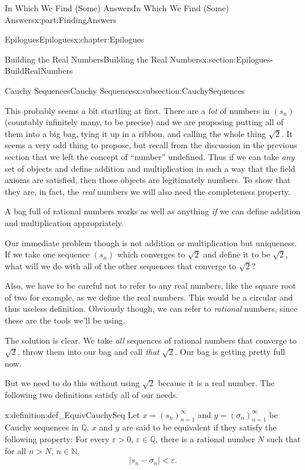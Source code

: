 \documentclass[oneside,10pt,]{book}
\numberwithin{equation}{section}
\newcommand{\abs}[1]{\left|#1\right|}
\newcommand{\eps}{\varepsilon}
\newcommand{\QQ}{\mathbb {Q}}
\newcommand{\NN}{\mathbb {N}}
\newcommand{\lt}{<}
\begin{document}
\begin{partptx}{In Which We Find (Some) Answers}{}{In Which We Find (Some) Answers}{}{}{x:part:FindingAnswers}
\begin{chapterptx}{Epilogues}{}{Epilogues}{}{}{x:chapter:Epilogues}
\begin{sectionptx}{Building the Real Numbers}{}{Building the Real Numbers}{}{}{x:section:Epilogues-BuildRealNumbers}
\begin{subsectionptx}{Cauchy Sequences}{}{Cauchy Sequences}{}{}{x:subsection:CauchySequences}
\par
This probably seems a bit startling at first. There are a \emph{lot} of numbers in \(\left(s_n\right)\) (countably infinitely many, to be precise) and we are proposing putting all of them into a big bag, tying it up in a ribbon, and calling the whole thing \(\sqrt{2}\). It seems a very odd thing to propose, but recall from the discussion in the previous section that we left the concept of ``number'' undefined. Thus if we can take \emph{any} set of objects and define addition and multiplication in such a way that the field axioms are satisfied, then those objects are legitimately numbers. To show that they are, in fact, the \emph{real} numbers we will also need the completeness property.%
\par
A bag full of rational numbers works as well as anything \emph{if} we can define addition and multiplication appropriately.%
\par
Our immediate problem though is not addition or multiplication but uniqueness. If we take one sequence \(\left(s_n\right)\) which converges to \(\sqrt{2}\) and define it to be \(\sqrt{2}\), what will we do with all of the other sequences that converge to \(\sqrt{2}?\)%
\par
Also, we have to be careful not to refer to any real numbers, like the square root of two for example, as we define the real numbers. This would be a circular \textemdash{} and thus useless \textemdash{} definition. Obviously though, we can refer to \emph{rational} numbers, since these are the tools we'll be using.%
\par
The solution is clear. We take \emph{all} sequences of rational numbers that converge to \(\sqrt{2}\), throw them into our bag and call \emph{that} \(\sqrt{2}\). Our bag is getting pretty full now.%
\par
But we need to do this without using \(\sqrt{2}\) because it is a real number. The following two definitions satisfy all of our needs.%
\begin{definition}{}{x:definition:def_EquivCauchySeq}%
 Let \(x=\left(s_n\right)_{n=1}^\infty\) and \(y=\left(\sigma_n\right)_{n=1}^\infty\) be Cauchy sequences in \(\QQ\). \(x\) and \(y\) are said to be equivalent if they satisfy the following property: For every \(\eps>0\), \(\eps\in\QQ\), there is a rational number \(N\) such that for all \(n>N\), \(n\in\NN\),%
\begin{equation*}
\abs{s_n-\sigma_n}\lt \eps\text{.}
\end{equation*}

\end{definition}
\end{subsectionptx}
\end{sectionptx}
\end{chapterptx}
\end{partptx}
\end{document}
